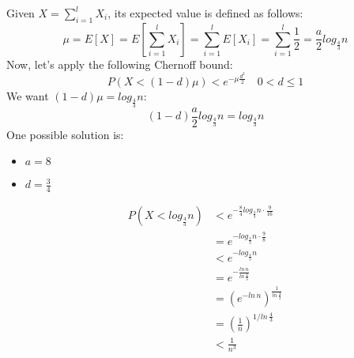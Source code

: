 Given $X = \sum_{i=1}^l X_i$, its expected value is defined as follows:
\[\mu = E[X] = E\left[\sum_{i=1}^l X_i\right] = \sum_{i=1}^l E[X_i] = \sum_{i=1}^l \frac{1}{2} = \frac{a}{2}log_{\frac{4}{3}}n\]
Now, let's apply the following Chernoff bound:
\[P(X < (1 - d)\mu) < e^{-\mu\frac{d^2}{2}} \quad 0 < d \leq 1\]
We want $(1 - d)\mu = log_{\frac{4}{3}}n$:
\[(1-d)\frac{a}{2}log_{\frac{4}{3}}n = log_{\frac{4}{3}}n\]
One possible solution is:
\begin{itemize}
    \item $a = 8$
    \item $d = \frac{3}{4}$
\end{itemize}
\[
    \begin{split}
        P(X < log_{\frac{4}{3}}n) & < e^{-\frac{8}{4}log_{\frac{4}{3}}n \cdot \frac{9}{16}} \\
        & = e^{-log_{\frac{4}{3}}n\cdot\frac{9}{8}}\\
        & < e^{-log_{\frac{4}{3}}n}\\
        & = e^{-\frac{ln\,n}{ln\,\frac{4}{3}}}\\
        & = \left(e^{-ln\,n}\right)^{\frac{1}{ln\,\frac{4}{3}}}\\
        & = \left(\frac{1}{n}\right)^{1/ln\,\frac{4}{3}}\\
        & < \frac{1}{n^3}
    \end{split}
\]
